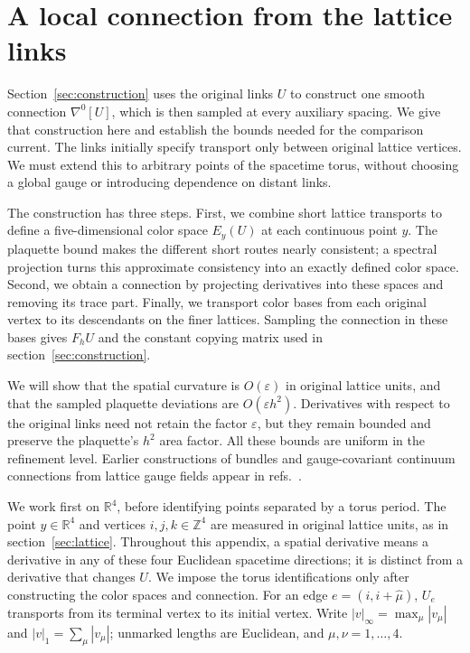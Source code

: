 \documentclass[11pt,a4paper]{article}
\theoremstyle{remark}
\newcommand{\eps}{\varepsilon}
\begin{document}
\appendix

\section{A local connection from the lattice links}
\label{app:g:geometry}

Section~\ref{sec:construction} uses the original links $U$ to construct
one smooth connection $\nabla^0[U]$, which is then sampled at every
auxiliary spacing. We give that construction here and establish the
bounds needed for the comparison current. The links initially specify
transport only between original lattice vertices. We must extend this
to arbitrary points of the spacetime torus, without choosing a global
gauge or introducing dependence on distant links.

The construction has three steps. First, we combine short lattice
transports to define a five-dimensional color space $E_y(U)$ at each
continuous point $y$. The plaquette bound makes the different short
routes nearly consistent; a spectral projection turns this approximate
consistency into an exactly defined color space. Second, we obtain a
connection by projecting derivatives into these spaces and removing its
trace part. Finally, we transport color bases from each original vertex
to its descendants on the finer lattices. Sampling the connection in
these bases gives $F_hU$ and the constant copying matrix used in
section~\ref{sec:construction}.

We will show that the spatial curvature is $O(\eps)$ in original lattice units,
and that the sampled plaquette deviations are $O(\eps h^2)$. Derivatives
with respect to the original links need not retain the factor $\eps$,
but they remain bounded and preserve the plaquette's $h^2$ area factor.
All these bounds are uniform in the refinement level. Earlier
constructions of bundles and gauge-covariant continuum connections from
lattice gauge fields appear in
refs.~\cite{PhillipsStone1986,GockelerKronfeldSchierholzWiese}.

We work first on $\mathbb R^4$, before identifying points separated by
a torus period. The point $y\in\mathbb R^4$ and vertices
$i,j,k\in\mathbb Z^4$ are measured in original lattice units, as in
section~\ref{sec:lattice}. Throughout this appendix, a spatial derivative
means a derivative in any of these four Euclidean spacetime directions;
it is distinct from a derivative that changes $U$. We impose the torus
identifications only after constructing the color spaces and connection.
For an edge $e=(i,i+\hat\mu)$, $U_e$ transports from its terminal vertex
to its initial vertex. Write
$|v|_\infty=\max_\mu|v_\mu|$ and $|v|_1=\sum_\mu|v_\mu|$;
unmarked lengths are Euclidean, and $\mu,\nu=1,\ldots,4$.
\end{document}
